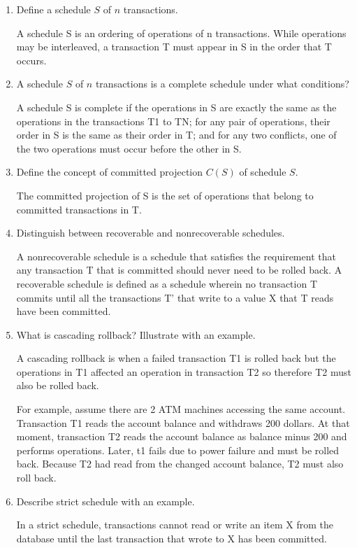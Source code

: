 \documentclass[11pt]{article}
\begin{document}
\begin{enumerate}
		\item Define a schedule $S$ of $n$ transactions.
	
		A schedule S is an ordering of operations of n transactions. While operations may be interleaved, a transaction T must appear in S in the order that T occurs.
		
		\item A schedule $S$ of $n$ transactions is a complete schedule under what conditions?
		
		A schedule S is complete if the operations in S are exactly the same as the operations in the transactions T1 to TN; for any pair of operations, their order in S is the same as their order in T; and for any two conflicts, one of the two operations must occur before the other in S.
		
		\item Define the concept of committed projection $C(S)$ of schedule $S$.
		
		The committed projection of S is the set of operations that belong to committed transactions in T.
		
		\item Distinguish between recoverable and nonrecoverable schedules.
		
		A nonrecoverable schedule is a schedule that satisfies the requirement that any transaction T that is committed should never need to be rolled back. A recoverable schedule is defined as a schedule wherein no transaction T commits until all the transactions T' that write to a value X that T reads have been committed.
		
		\item What is cascading rollback? Illustrate with an example.
		
		A cascading rollback is when a failed transaction T1 is rolled back but the operations in T1 affected an operation in transaction T2 so therefore T2 must also be rolled back.
		
		For example, assume there are 2 ATM machines accessing the same account. Transaction T1 reads the account balance and withdraws 200 dollars. At that moment, transaction T2 reads the account balance as balance minus 200 and performs operations. Later, t1 fails due to power failure and must be rolled back. Because T2 had read from the changed account balance, T2 must also roll back.
		
		\item Describe strict schedule with an example.
		
		In a strict schedule, transactions cannot read or write an item X from the database until the last transaction that wrote to X has been committed.
		

\end{enumerate}
\end{document}
